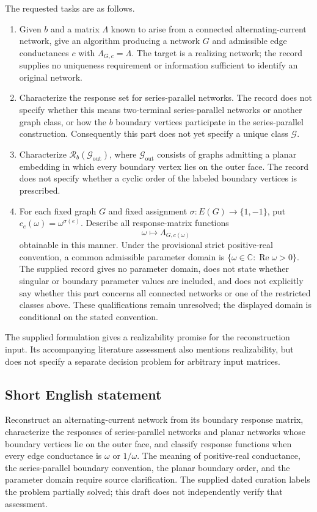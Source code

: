 \documentclass[11pt]{article}
\newcommand{\C}{\mathbb{C}}
\begin{document}
The requested tasks are as follows.
\begin{enumerate}
\item Given \(b\) and a matrix \(\Lambda\) known to arise from a connected alternating-current network, give an algorithm producing a network \(G\) and admissible edge conductances \(c\) with \(\Lambda_{G,c}=\Lambda\). The target is a realizing network; the record supplies no uniqueness requirement or information sufficient to identify an original network.
\item Characterize the response set for series-parallel networks. The record does not specify whether this means two-terminal series-parallel networks or another graph class, or how the \(b\) boundary vertices participate in the series-parallel construction. Consequently this part does not yet specify a unique class \(\mathcal G\).
\item Characterize \(\mathcal R_b(\mathcal G_{\mathrm{out}})\), where \(\mathcal G_{\mathrm{out}}\) consists of graphs admitting a planar embedding in which every boundary vertex lies on the outer face. The record does not specify whether a cyclic order of the labeled boundary vertices is prescribed.
\item For each fixed graph \(G\) and fixed assignment \(\sigma:E(G)\to\{1,-1\}\), put \(c_e(\omega)=\omega^{\sigma(e)}\). Describe all response-matrix functions
\[
\omega\longmapsto\Lambda_{G,c(\omega)}
\]
obtainable in this manner. Under the provisional strict positive-real convention, a common admissible parameter domain is \(\{\omega\in\C:\operatorname{Re}\omega>0\}\). The supplied record gives no parameter domain, does not state whether singular or boundary parameter values are included, and does not explicitly say whether this part concerns all connected networks or one of the restricted classes above. These qualifications remain unresolved; the displayed domain is conditional on the stated convention.
\end{enumerate}
The supplied formulation gives a realizability promise for the reconstruction input. Its accompanying literature assessment also mentions realizability, but does not specify a separate decision problem for arbitrary input matrices.
\subsection{Short English statement}
Reconstruct an alternating-current network from its boundary response matrix, characterize the responses of series-parallel networks and planar networks whose boundary vertices lie on the outer face, and classify response functions when every edge conductance is \(\omega\) or \(1/\omega\). The meaning of positive-real conductance, the series-parallel boundary convention, the planar boundary order, and the parameter domain require source clarification. The supplied dated curation labels the problem partially solved; this draft does not independently verify that assessment.
\end{document}
